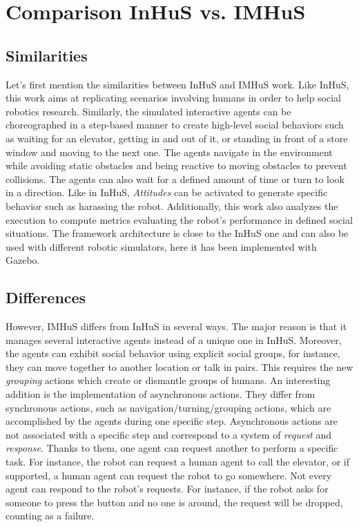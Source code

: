 \section{Comparison InHuS vs. IMHuS}

\subsection{Similarities}

Let's first mention the similarities between InHuS and IMHuS work. Like InHuS, this work aims at replicating scenarios involving humans in order to help social robotics research. Similarly, the simulated interactive agents can be choreographed in a step-based manner to create high-level social behaviors such as waiting for an elevator, getting in and out of it, or standing in front of a store window and moving to the next one. The agents navigate in the environment while avoiding static obstacles and being reactive to moving obstacles to prevent collisions. The agents can also wait for a defined amount of time or turn to look in a direction. Like in InHuS, \textit{Attitudes} can be activated to generate specific behavior such as harassing the robot. Additionally, this work also analyzes the execution to compute metrics evaluating the robot's performance in defined social situations. The framework architecture is close to the InHuS one and can also be used with different robotic simulators, here it has been implemented with Gazebo.


\subsection{Differences}
However, IMHuS differs from InHuS in several ways. The major reason is that it manages several interactive agents instead of a unique one in InHuS. Moreover, the agents can exhibit social behavior using explicit social groups, for instance, they can move together to another location or talk in pairs. This requires the new \textit{grouping} actions which create or dismantle groups of humans. An interesting addition is the implementation of asynchronous actions. They differ from synchronous actions, such as navigation/turning/grouping actions, which are accomplished by the agents during one specific step. Asynchronous actions are not associated with a specific step and correspond to a system of \textit{request} and \textit{response}. Thanks to them, one agent can request another to perform a specific task. For instance, the robot can request a human agent to call the elevator, or if supported, a human agent can request the robot to go somewhere. Not every agent can respond to the robot's requests. For instance, if the robot asks for someone to press the button and no one is around, the request will be dropped, counting as a failure. 

